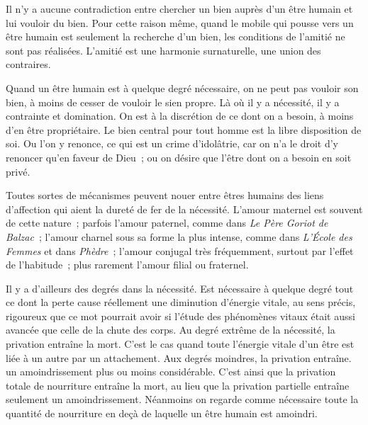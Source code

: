 \documentclass[french,twoside]{book} %
\begin{document}
Il n'y a aucune contradiction entre chercher un bien auprès d'un être humain et lui vouloir du bien. Pour cette raison même, quand le mobile qui pousse vers un être humain est seulement la recherche d'un bien, les conditions de l'amitié ne sont pas réalisées. L'amitié est une harmonie surnaturelle, une union des contraires.\par
Quand un être humain est à quelque degré nécessaire, on ne peut pas vouloir son bien, à moins de cesser de vouloir le sien propre. Là où il y a nécessité, il y a contrainte et domination. On est à la discrétion de ce dont on a besoin, à moins d'en être propriétaire. Le bien central pour tout homme est la libre disposition de soi. Ou l'on y renonce, ce qui est un crime d'idolâtrie, car on n'a le droit d'y renoncer qu'en faveur de Dieu ; ou on désire que l'être dont on a besoin en soit privé.\par
Toutes sortes de mécanismes peuvent nouer entre êtres humains des liens d'affection qui aient la dureté de fer de la nécessité. L'amour maternel est souvent de cette nature ; parfois l'amour paternel, comme dans {\itshape Le Père Goriot de Balzac} ; l'amour charnel sous sa forme la plus intense, comme dans {\itshape L'École des Femmes} et dans {\itshape Phèdre} ; l'amour conjugal très fréquemment, surtout par l'effet de l'habitude ; plus rarement l'amour filial ou fraternel.\par
Il y a d'ailleurs des degrés dans la nécessité. Est nécessaire à quelque degré tout ce dont la perte cause réellement une diminution d'énergie vitale, au sens précis, rigoureux que ce mot pourrait avoir si l'étude des phénomènes vitaux était aussi avancée que celle de la chute des corps. Au degré extrême de la nécessité, la privation entraîne la mort. C'est le cas quand toute l'énergie vitale d'un être est liée à un autre par un attachement. Aux degrés moindres, la privation entraîne. un amoindrissement plus ou moins considérable. C'est ainsi que la privation totale de nourriture entraîne la mort, au lieu que la privation partielle entraîne seulement un amoindrissement. Néanmoins on regarde comme nécessaire toute la quantité de nourriture en deçà de laquelle un être humain est amoindri.\par
\end{document}
